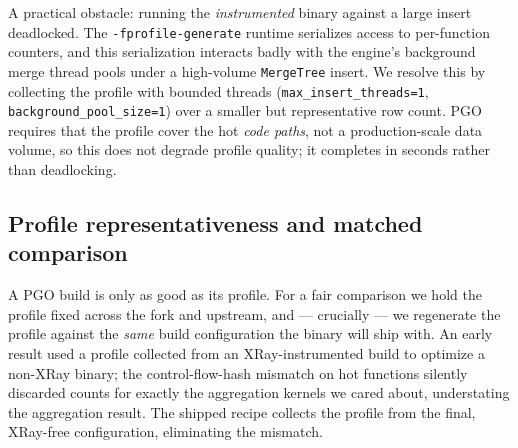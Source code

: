 A practical obstacle: running the \emph{instrumented} binary against a
large insert deadlocked. The \texttt{-fprofile-generate} runtime serializes
access to per-function counters, and this serialization interacts badly with
the engine's background merge thread pools under a high-volume
\texttt{MergeTree} insert. We resolve this by collecting the profile with
bounded threads (\texttt{max\_insert\_threads=1},
\texttt{background\_pool\_size=1}) over a smaller but representative row count.
PGO requires that the profile cover the hot \emph{code paths}, not a
production-scale data volume, so this does not degrade profile quality; it
completes in seconds rather than deadlocking.

\subsection{Profile representativeness and matched comparison}

A PGO build is only as good as its profile. For a fair comparison we hold the
profile fixed across the fork and upstream, and --- crucially --- we regenerate
the profile against the \emph{same} build configuration the binary will ship
with. An early result used a profile collected from an XRay-instrumented build
to optimize a non-XRay binary; the control-flow-hash mismatch on hot functions
silently discarded counts for exactly the aggregation kernels we cared about,
understating the aggregation result. The shipped recipe collects the profile
from the final, XRay-free configuration, eliminating the mismatch.
